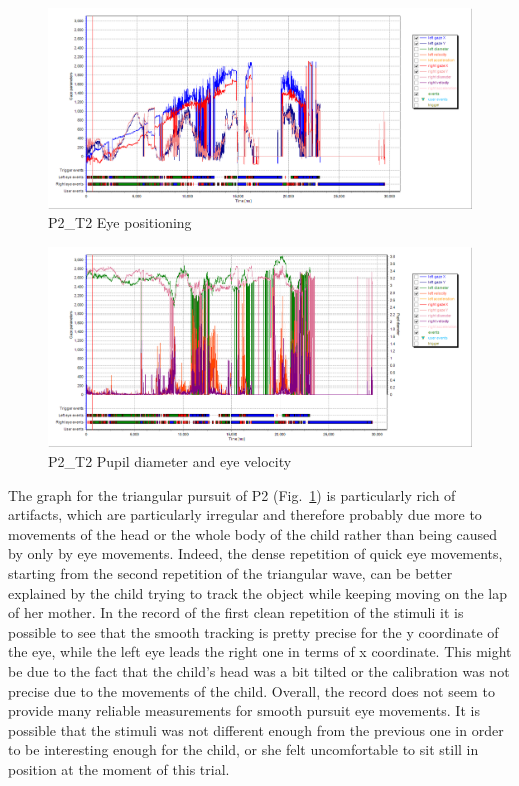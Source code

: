 \begin{figure}[t]
  \centering
  \includegraphics[width=.8\textwidth]{figures/graphs/P2_T2(triangular)_XY.png}
  \caption[P1\_T2 Eye positioning]{P2\_T2 Eye positioning}
  \label{fig:P2_T2_pos}
\end{figure}

\begin{figure}[t]
  \centering
  \includegraphics[width=.8\textwidth]{figures/graphs/P2_T2(triangular)_VP.png}
  \caption[P2\_T2 Pupil size and velocity profile]{P2\_T2 Pupil diameter and eye velocity}
  \label{fig:P2_T2_vel}
\end{figure}

The graph for the triangular pursuit of P2 (Fig.~\ref{fig:P2_T2_pos})  is particularly rich of artifacts, which are particularly irregular and therefore probably due more to movements of the head or the whole body of the child rather than being caused by only by eye movements. Indeed, the dense repetition of quick eye movements, starting from the second repetition of the triangular wave, can be better explained by the child trying to track the object while keeping moving on the lap of her mother. In the record of the first clean repetition of the stimuli it is possible to see that the smooth tracking is pretty precise for the y coordinate of the eye, while the left eye leads the right one in terms of x coordinate. This might be due to the fact that the child’s head was a bit tilted or the calibration was not precise due to the movements of the child. Overall, the record does not seem to provide many reliable measurements for smooth pursuit eye movements. It is possible that the stimuli was not different enough from the previous one in order to be interesting enough for the child, or she felt uncomfortable to sit still in position at the moment of this trial.

